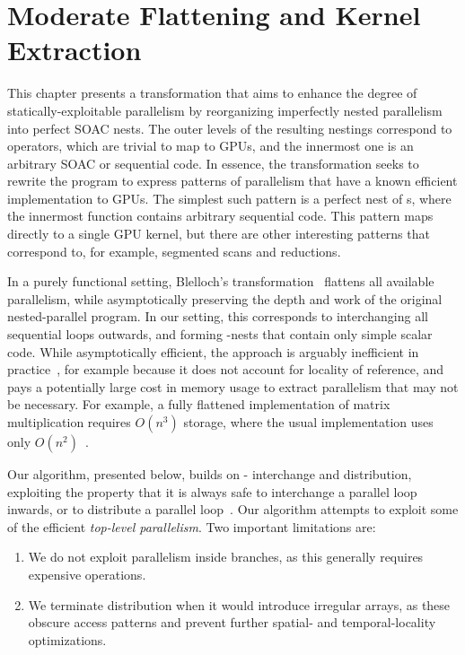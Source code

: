\renewcommand{\G}[1]{G#1}

\chapter{Moderate Flattening and Kernel Extraction}
\label{chap:kernel-extraction}

This chapter presents a transformation that aims to enhance the degree
of statically-exploitable parallelism by reorganizing imperfectly
nested parallelism into perfect SOAC nests.  The outer levels of the
resulting nestings correspond to  operators, which are trivial
to map to GPUs, and the innermost one is an arbitrary SOAC or
sequential code.  In essence, the transformation seeks to rewrite the
program to express patterns of parallelism that have a known efficient
implementation to GPUs.  The simplest such pattern is a perfect nest
of s, where the innermost function contains arbitrary
sequential code.  This pattern maps directly to a single GPU kernel,
but there are other interesting patterns that correspond to, for
example, segmented scans and reductions.

In a purely functional setting, Blelloch's
transformation~\cite{blelloch1990vector} flattens all available
parallelism, while asymptotically preserving the depth and work of the
original nested-parallel program.  In our setting, this corresponds to
interchanging all sequential loops outwards, and forming
-nests that contain only simple scalar code.  While
asymptotically efficient, the approach is arguably inefficient in
practice~\cite{bergstrom2012nested}, for example because it does not
account for locality of reference, and pays a potentially large cost
in memory usage to extract parallelism that may not be necessary.  For
example, a fully flattened implementation of matrix multiplication
requires $O(n^{3})$ storage, where the usual implementation uses only
$O(n^{2})$~\cite{Spoonhower:2008:SPP:1411204.1411240}.

Our algorithm, presented below, builds on -
interchange and  distribution, exploiting the property that it
is always safe to interchange a parallel loop inwards, or to
distribute a parallel loop~\cite{Allen-Kennedy2002}.  Our algorithm
attempts to exploit some of the efficient \textit{top-level
  parallelism}.  Two important limitations are:

\begin{enumerate}
\item We do not exploit parallelism inside  branches, as this
  generally requires expensive  operations.
\item We terminate distribution when it would introduce irregular
  arrays, as these obscure access patterns and prevent further
  spatial- and temporal-locality optimizations.
\end{enumerate}


